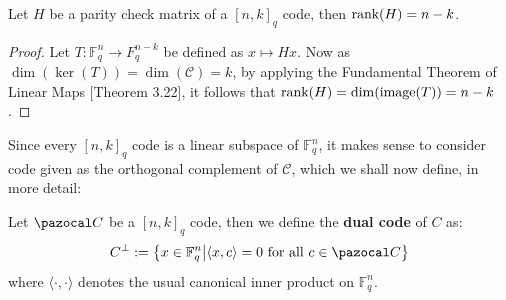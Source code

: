 \begin{lemma}\label{lem:H_has_rank_n-k}
  Let $H$ be a parity check matrix of a $[n,k]_{q}$ code, then $\textnormal{rank}(H) = n - k$.
\end{lemma}
\begin{proof} %
  Let $T: \mathbb{F}_q^n \to F^{n-k}_{q}$ be defined as $x \mapsto Hx$. Now as $\dim(\ker(T)) = \dim(\mathcal{C}) = k$, by applying the Fundamental Theorem of Linear Maps \cite{lama_sheldon}[Theorem 3.22], it follows that $\textnormal{rank}(H) = \dim(\textnormal{image}(T)) = n - k$.
\end{proof}
Since every $[n, k]_{q}$ code is a linear subspace of $\mathbb{F}_{q}^{n}$, it makes sense to consider code given as the orthogonal complement of $\mathcal{C}$, which we shall now define, in more detail:

\begin{definition}
  Let $\C$ be a $[n, k]_{q}$ code, then we define the \textbf{dual code} of $C$ as:
  \begin{equation*}
    C^{\perp} := \left\{x \in \F_{q}^{n} \middle| \langle x, c \rangle = 0 \text{ for all } c \in \C\right\}
  \end{equation*}
  where $\langle \cdot, \cdot \rangle$ denotes the usual canonical inner product on $\mathbb{F}_{q}^{n}$. %
\end{definition}

